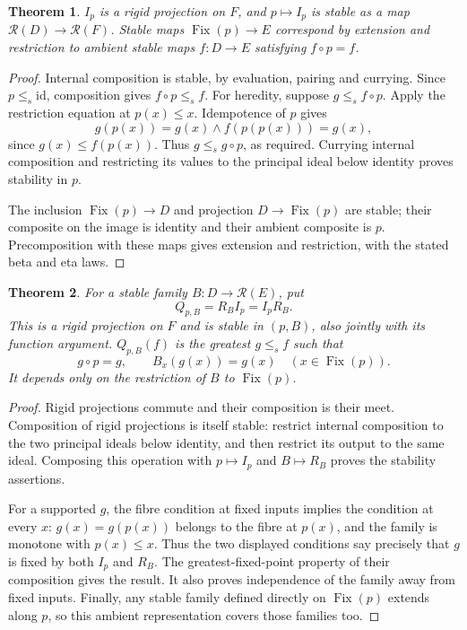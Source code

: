 \documentclass[11pt]{article}
\newtheorem{theorem}{Theorem}[section]
\newcommand{\Fix}{\operatorname{Fix}}
\newcommand{\id}{\mathrm{id}}
\begin{document}
\begin{theorem}
$I_p$ is a rigid projection on $F$, and $p\mapsto I_p$ is stable as a map
$\mathcal R(D)\to\mathcal R(F)$. Stable maps $\Fix(p)\to E$ correspond
by extension and restriction to ambient stable maps $f:D\to E$ satisfying
$f\circ p=f$.
\end{theorem}
\begin{proof}
Internal composition is stable, by evaluation, pairing and currying.
Since $p\le_s\id$, composition gives $f\circ p\le_s f$.
For heredity, suppose $g\le_s f\circ p$. Apply the restriction equation
at $p(x)\le x$. Idempotence of $p$ gives
\[
 g(p(x))=g(x)\wedge f(p(p(x)))=g(x),
\]
since $g(x)\le f(p(x))$. Thus $g\le_s g\circ p$, as required.
Currying internal composition and restricting its values to the
principal ideal below identity proves stability in $p$.

The inclusion $\Fix(p)\to D$ and projection $D\to\Fix(p)$ are stable;
their composite on the image is identity and their ambient composite
is $p$. Precomposition with these maps gives extension and restriction,
with the stated beta and eta laws.
\end{proof}

\begin{theorem}
For a stable family $B:D\to\mathcal R(E)$, put
\[
 Q_{p,B}=R_B I_p=I_p R_B.
\]
This is a rigid projection on $F$ and is stable in $(p,B)$, also jointly
with its function argument. $Q_{p,B}(f)$ is the greatest $g\le_s f$ such that
\[
 g\circ p=g,\qquad B_x(g(x))=g(x)\quad(x\in\Fix(p)).
\]
It depends only on the restriction of $B$ to $\Fix(p)$.
\end{theorem}
\begin{proof}
Rigid projections commute and their composition is their meet.
Composition of rigid projections is itself stable: restrict internal
composition to the two principal ideals below identity, and then
restrict its output to the same ideal. Composing this operation with
$p\mapsto I_p$ and $B\mapsto R_B$ proves the stability assertions.

For a supported $g$, the fibre condition at fixed inputs implies the
condition at every $x$: $g(x)=g(p(x))$ belongs to the fibre at $p(x)$,
and the family is monotone with $p(x)\le x$. Thus the two displayed
conditions say precisely that $g$ is fixed by both $I_p$ and $R_B$.
The greatest-fixed-point property of their composition gives the result.
It also proves independence of the family away from fixed inputs.
Finally, any stable family defined directly on $\Fix(p)$ extends along
$p$, so this ambient representation covers those families too.
\end{proof}
\end{document}
